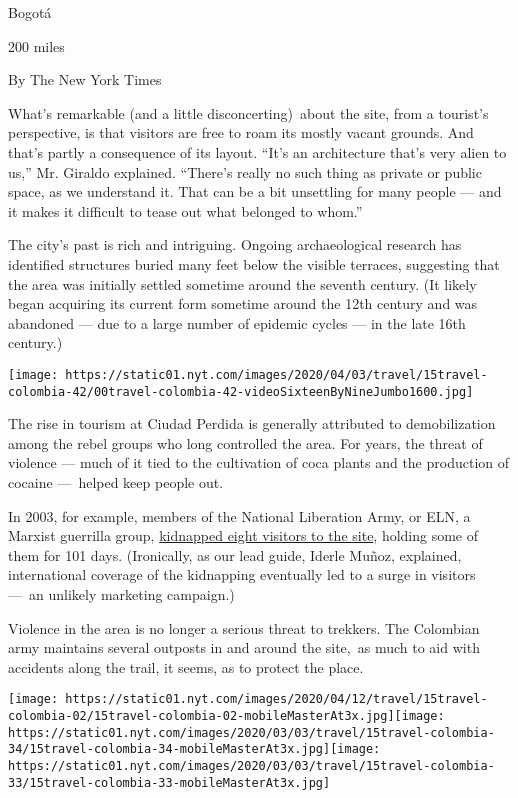 Bogotá

200 miles

By The New York Times

What's remarkable (and a little disconcerting)~about the site, from a
tourist's perspective, is that visitors are free to roam its mostly
vacant grounds. And that's partly a consequence of its layout. ``It's an
architecture that's very alien to us,'' Mr. Giraldo explained. ``There's
really no such thing as private or public space, as we understand it.
That can be a bit unsettling for many people --- and it makes it
difficult to tease out what belonged to whom.''

The city's past is rich and intriguing. Ongoing archaeological research
has identified structures buried many feet below the visible terraces,
suggesting that the area was initially settled sometime around the
seventh century. (It likely began acquiring its current form sometime
around the 12th century and was abandoned --- due to a large number of
epidemic cycles --- in the late 16th century.)

\texttt{[image: https://static01.nyt.com/images/2020/04/03/travel/15travel-colombia-42/00travel-colombia-42-videoSixteenByNineJumbo1600.jpg]}

The rise in tourism at Ciudad Perdida is generally attributed to
demobilization among the rebel groups who long controlled the area. For
years, the threat of violence --- much of it tied to the cultivation of
coca plants and the production of cocaine ---~helped keep people out.

In 2003, for example, members of the National Liberation Army, or ELN, a
Marxist guerrilla group,
\href{https://www.theguardian.com/travel/2009/oct/24/colombia-lost-city-kidnapping}{kidnapped
eight visitors to the site}, holding some of them for 101 days.
(Ironically, as our lead guide, Iderle Muñoz, explained, international
coverage of the kidnapping eventually led to a surge in visitors ---~an
unlikely marketing campaign.)

Violence in the area is no longer a serious threat to trekkers. The
Colombian army maintains several outposts in and around the site,~as
much to aid with accidents along the trail, it seems, as to protect the
place.

\texttt{[image: https://static01.nyt.com/images/2020/04/12/travel/15travel-colombia-02/15travel-colombia-02-mobileMasterAt3x.jpg]}\texttt{[image: https://static01.nyt.com/images/2020/03/03/travel/15travel-colombia-34/15travel-colombia-34-mobileMasterAt3x.jpg]}\texttt{[image: https://static01.nyt.com/images/2020/03/03/travel/15travel-colombia-33/15travel-colombia-33-mobileMasterAt3x.jpg]}

